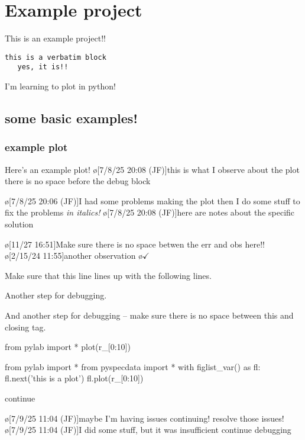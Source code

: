 \section{Example project}
This is an example project!!
\begin{verbatim}
this is a verbatim block
   yes, it is!!
\end{verbatim}
I'm learning to plot in python!

\subsection{some basic examples!}
\subsubsection{example plot}\label{sec:examplePlot1}
Here's an example plot!
\o[7/8/25 20:08 (JF)]{this is what I observe about the plot there is no space before the debug block}
\begin{err}
    \o[7/8/25 20:06 (JF)]{I had some problems making the plot}
    then I do some stuff to fix the problems
    \textit{in italics!}
    \o[7/8/25 20:08 (JF)]{here are notes about the specific solution}
\end{err}
\o[11/27 16:51]{Make sure there is no space betwen the err and obs here!!}
\o[2/15/24 11:55]{another observation}
\o{$\checkmark$}

\begin{err}
    Make sure that this line lines up with the following lines.

    Another step for debugging.

    And another step for debugging -- make sure there is no space between this and closing tag.
\end{err}
\par
\begin{python}[on]
from pylab import *
plot(r_[0:10])
\end{python}
\par
\par
\begin{python}[on]
from pylab import *
from pyspecdata import *
with figlist_var() as fl:
    fl.next('this is a plot')
    fl.plot(r_[0:10])
\end{python}
\par
continue

\begin{err}
    \o[7/9/25 11:04 (JF)]{maybe I'm having issues continuing!}
    resolve those issues!
    \o[7/9/25 11:04 (JF)]{I did some stuff, but it was insufficient}
    continue debugging

\end{err}
